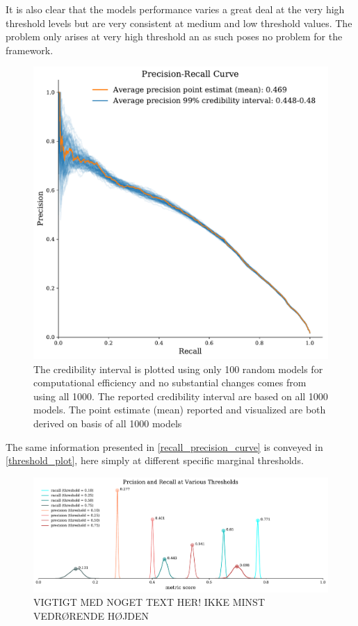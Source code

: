 \documentclass[a4paper]{article}
\begin{document}
It is also clear that the models performance varies a great deal at the very high threshold levels but are very consistent at medium and low threshold values. The problem only arises at very high threshold an as such poses no problem for the framework.\par 


\begin{figure}[!htb]
	\centering
	\includegraphics[scale=0.5]{pr_curve.pdf}
    \caption{\footnotesize{The credibility interval is plotted using only 100 random models for computational efficiency and no substantial changes comes from using all 1000. The reported credibility interval are based on all 1000 models. The point estimate (mean) reported and visualized are both derived on basis of all 1000 models}}\label{recall_precision_curve}
\end{figure}


The same information presented in \autoref{recall_precision_curve} is conveyed in \autoref{threshold_plot}, here simply at different specific marginal thresholds.\par

\begin{figure}[!htb]
	\centering
	\includegraphics[scale=0.5]{threshold_plot.pdf}
    \caption{\footnotesize{VIGTIGT MED NOGET TEXT HER! IKKE MINST VEDRØRENDE HØJDEN}}\label{threshold_plot}
\end{figure}
\end{document}
